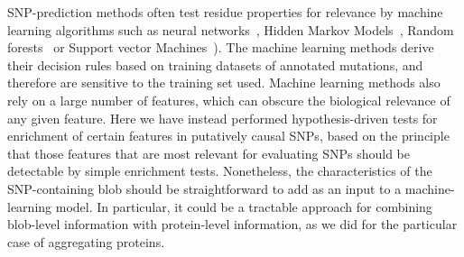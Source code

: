 \documentclass[10pt,letterpaper]{article}
\newcommand{\grace}[1]{\textcolor{red}{#1}}
\begin{document}

SNP-prediction methods often test residue properties for relevance by machine learning algorithms such as neural networks~\cite{Bromberg2007, Hecht2015, LopezFerrando2017}, Hidden Markov Models~\cite{Thomas2004,Shihab2012}, Random forests~\cite{Niroula2015, Wainreb2010} or Support vector Machines~\cite{Yue2005,Rentzsch2018,Calabrese2009,Capriotti2006}). The machine learning methods derive their decision rules based on training datasets of annotated mutations, and therefore are sensitive to the training set used. Machine learning methods also rely on a large number of features, which can obscure the biological relevance of any given feature. Here we have instead performed hypothesis-driven tests for enrichment of certain features in putatively causal SNPs, based on the principle that those features that are most relevant for evaluating SNPs should be detectable by simple enrichment tests. Nonetheless, the characteristics of the SNP-containing blob should be straightforward to add as an input to a machine-learning model. In particular, it could be a tractable approach for combining blob-level information with protein-level information, as we did for the particular case of aggregating proteins. 
\end{document}
